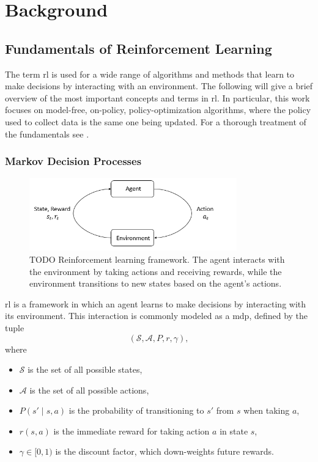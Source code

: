 \chapter{Background}
\section{Fundamentals of Reinforcement Learning}
The term \gls{rl} is used for a wide range of algorithms and methods that learn to make decisions by interacting with an environment. The following will give a brief overview of the most important concepts and terms in \gls{rl}. In particular, this work focuses on model-free, on-policy, policy-optimization algorithms, where the policy used to collect data is the same one being updated. For a thorough treatment of the fundamentals see \cite{SuttonBarto2018}.
\subsection{Markov Decision Processes}
\begin{figure}
\centering
\includegraphics[width=0.8\textwidth]{images/rl_diagram.png}
\caption{TODO   Reinforcement learning framework. The agent interacts with the environment by taking actions and receiving rewards, while the environment transitions to new states based on the agent's actions.}
\label{fig:rl_diagram}
\end{figure}

\gls{rl} is a framework in which an agent learns to make decisions by interacting with its environment.  This interaction is commonly modeled as a \gls{mdp}, defined by the tuple
\[
(\mathcal{S}, \mathcal{A}, P, r, \gamma),
\]
where
\begin{itemize}
  \item \(\mathcal{S}\) is the set of all possible states,
  \item \(\mathcal{A}\) is the set of all possible actions,
  \item \(P(s'\!\mid\!s,a)\) is the probability of transitioning to \(s'\) from \(s\) when taking \(a\),
  \item \(r(s,a)\) is the immediate reward for taking action \(a\) in state \(s\),
  \item \(\gamma\in[0,1)\) is the discount factor, which down-weights future rewards.
\end{itemize}

